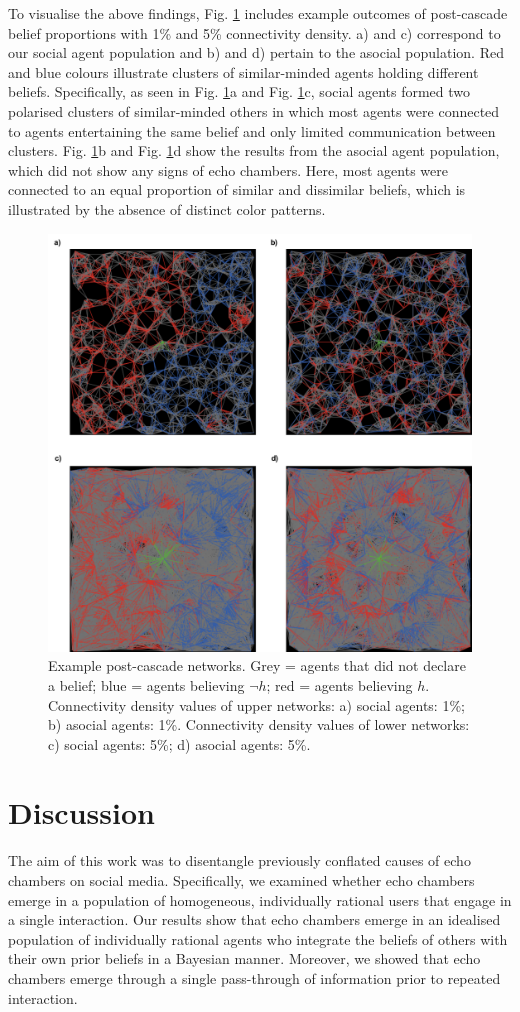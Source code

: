 \documentclass[fleqn,10pt]{wlscirep}
\begin{document}
To visualise the above findings, Fig. \ref{fig:example_nets} includes example outcomes of post-cascade belief proportions with 1\% and 5\% connectivity density. a) and c) correspond to our social agent population and b) and d) pertain to the asocial population. Red and blue colours illustrate clusters of similar-minded agents holding different beliefs. Specifically, as seen in  Fig. \ref{fig:example_nets}a and  Fig. \ref{fig:example_nets}c, social agents formed two polarised clusters of similar-minded others in which most agents were connected to agents entertaining the same belief and only limited communication between clusters. Fig. \ref{fig:example_nets}b and  Fig. \ref{fig:example_nets}d show the results from the asocial agent population, which did not show any signs of echo chambers. Here, most agents were connected to an equal proportion of similar and dissimilar beliefs, which is illustrated by the absence of distinct color patterns.


\begin{figure}[ht]
\centering
\includegraphics[width=0.8\columnwidth]{img/example_networks.pdf}
\caption{Example post-cascade networks. Grey = agents that did not declare a belief; blue = agents believing \(\neg h\); red = agents believing \(h\). Connectivity density values of upper networks: a) social agents: 1\%; b) asocial agents: 1\%. Connectivity density values of lower networks: c) social agents: 5\%; d) asocial agents: 5\%.}
\label{fig:example_nets}
\end{figure}

\section*{Discussion}
The aim of this work was to disentangle previously conflated causes of echo chambers on social media. Specifically, we examined whether echo chambers emerge in a population of homogeneous, individually rational users that engage in a single interaction. Our results show that echo chambers emerge in an idealised population of individually rational agents who integrate the beliefs of others with their own prior beliefs in a Bayesian manner. Moreover, we showed that echo chambers emerge through a single pass-through of information prior to repeated interaction.
\end{document}
